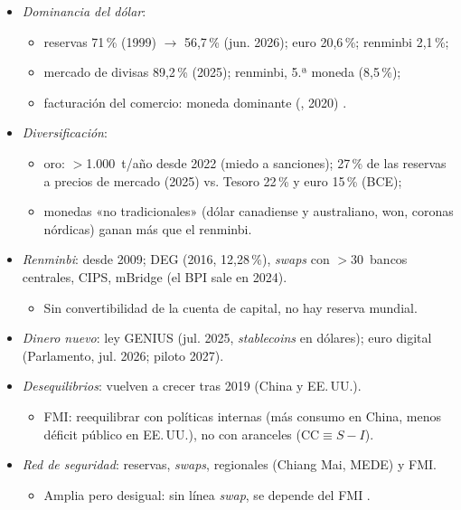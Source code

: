 \documentclass{article}
\begin{document}
\begin{columnas}
\begin{itemize}
\item \emph{Dominancia del dólar}:
  \begin{itemize}
  \item reservas 71\,\% (1999) $\to$ 56,7\,\% (jun. 2026); euro 20,6\,\%; renminbi 2,1\,\%;
  \item mercado de divisas 89,2\,\% (2025); renminbi, 5.ª moneda (8,5\,\%);
  \item facturación del comercio: moneda dominante (, 2020) .
  \end{itemize}
\item \emph{Diversificación}:
  \begin{itemize}
  \item oro: $>$1.000~t/año desde 2022 (miedo a sanciones); 27\,\% de las reservas a precios de mercado (2025) vs. Tesoro 22\,\% y euro 15\,\% (BCE);
  \item monedas «no tradicionales» (dólar canadiense y australiano, won, coronas nórdicas) ganan más que el renminbi.
  \end{itemize}
\item \emph{Renminbi}: desde 2009; DEG (2016, 12,28\,\%), \emph{swaps} con $>$30~bancos centrales, CIPS, mBridge (el BPI sale en 2024).
  \begin{itemize}
  \item Sin convertibilidad de la cuenta de capital, no hay reserva mundial.
  \end{itemize}
\item \emph{Dinero nuevo}: ley GENIUS (jul. 2025, \emph{stablecoins} en dólares); euro digital (Parlamento, jul. 2026; piloto 2027).
\item \emph{Desequilibrios}: vuelven a crecer tras 2019 (China y EE.\,UU.).
  \begin{itemize}
  \item FMI: reequilibrar con políticas internas (más consumo en China, menos déficit público en EE.\,UU.), no con aranceles ($\mathrm{CC}\equiv S-I$).
  \end{itemize}
\item \emph{Red de seguridad}: reservas, \emph{swaps}, regionales (Chiang Mai, MEDE) y FMI.
  \begin{itemize}
  \item Amplia pero desigual: sin línea \emph{swap}, se depende del FMI .
  \end{itemize}
\end{itemize}


\end{columnas}
\end{document}
